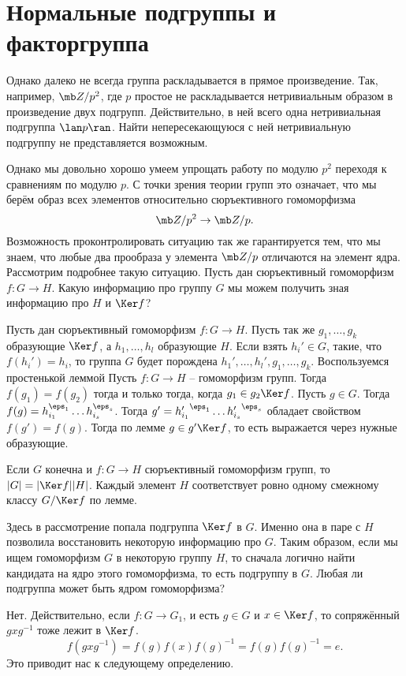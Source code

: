 \section{Нормальные подгруппы и факторгруппа}

Однако далеко не всегда группа раскладывается в прямое произведение. Так, например, $\mb Z/p^2$, где $p$ простое не раскладывается нетривиальным образом в произведение двух подгрупп. Действительно, в ней всего одна нетривиальная подгруппа $\lan p \ran$. Найти непересекающуюся с ней нетривиальную подгруппу не представляется возможным. 

Однако мы довольно хорошо умеем упрощать работу по модулю $p^2$ переходя к сравнениям по модулю $p$. С точки зрения теории групп это означает, что мы берём образ всех элементов относительно сюръективного гомоморфизма 
$$\mb Z/p^2 \to \mb Z/p.$$
Возможность проконтролировать ситуацию так же гарантируется тем, что мы знаем, что любые два прообраза у элемента $\mb Z/p$ отличаются на элемент ядра.
Рассмотрим подробнее такую ситуацию. Пусть дан сюръективный гомоморфизм $f \colon G \to H$. Какую информацию про группу $G$ мы можем получить зная информацию про $H$ и $\Ker f$?

\utv Пусть дан сюръективный гомоморфизм $f \colon G \to H$. Пусть так же $g_1,\dots,g_k$ образующие $\Ker f$, а $h_1,\dots, h_l$ образующие $H$. Если взять $h_i'\in G$, такие, что $f(h_i')=h_i$, то группа $G$ будет порождена $h_1',\dots,h_l', g_1,\dots,g_k$.
\eutv
\proof  Воспользуемся простенькой леммой
\lm Пусть $f\colon G \to H$ -- гомоморфизм групп. Тогда $f(g_1)=f(g_2)$ тогда и только тогда, когда $g_1\in g_2 \Ker f$.
\elm
Пусть $g\in G$. Тогда $f(g)=h_{i_1}^{\eps_1}\dots h_{i_s}^{\eps_s}$. Тогда $g'={h_{i_1}'}^{\eps_1}\dots {h'_{i_s}}^{\eps_s}$ обладает свойством $f(g')=f(g)$. Тогда по лемме $g\in g'\Ker f$, то есть выражается через нужные образующие.
\endproof

\utv  Если $G$ конечна  и  $f\colon G \to H$ сюръективный гомоморфизм групп, то $|G|=|\Ker f| |H|$.
\eutv
\proof Каждый элемент $H$ соответствует ровно одному смежному классу $G/\Ker f$ по лемме.
\endproof

Здесь в рассмотрение попала подгруппа $\Ker f$ в $G$. Именно она в паре с $H$ позволила восстановить некоторую информацию про $G$. Таким образом, если мы ищем гомоморфизм $G$ в некоторую группу $H$, то сначала логично найти кандидата на ядро этого гомоморфизма, то есть подгруппу в $G$. Любая ли подгруппа может быть ядром гомоморфизма? 

Нет. Действительно, если $f \colon G \to G_1$, и есть $g \in G$ и $x\in \Ker f$, то  сопряжённый $gxg^{-1}$ тоже лежит в $\Ker f$. 
$$f(gxg^{-1})=f(g)f(x)f(g)^{-1}=f(g)f(g)^{-1}=e.$$
Это приводит нас к следующему определению.


